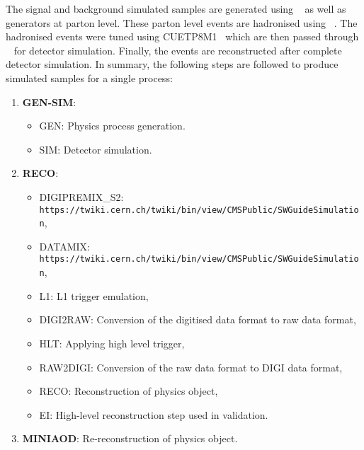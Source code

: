 The signal and background simulated samples are generated using \MGvATNLO~\cite{Alwall:2011uj, Alwall:2014hca}
as well as \POWHEG~\cite{Frixione:2007vw, Nason:2004rx, Alioli:2010xd} generators at parton level. 
These parton level events are hadronised using \PYTHIA~\cite{Sjostrand:2006za, Sjostrand:2007gs}. 
The hadronised events were tuned using  CUETP8M1~\cite{CMS-PAS-TOP-16-021} which are then passed
through \GEANTfour~\cite{Agostinelli:2002hh} for detector simulation. Finally, the events are
reconstructed after complete detector simulation. In summary, the 
following steps are followed to produce simulated samples for a single process:
\begin{enumerate}
    \item {\bf{GEN-SIM}}: 
        \begin{itemize}
            \item GEN: Physics process generation. 
            \item SIM: Detector simulation.
        \end{itemize}
    \item {\bf{RECO}}: 
        \begin{itemize}
            \item DIGIPREMIX\_S2: \\
                \verb|https://twiki.cern.ch/twiki/bin/view/CMSPublic/SWGuideSimulation|, 
            \item DATAMIX: \\\verb|https://twiki.cern.ch/twiki/bin/view/CMSPublic/SWGuideSimulation|,
            \item L1: L1 trigger emulation,
            \item DIGI2RAW: Conversion of the digitised data format to raw data format, 
            \item HLT: Applying high level trigger,
            \item RAW2DIGI: Conversion of the raw data format to DIGI data format,
            \item RECO: Reconstruction of physics object,
            \item EI: High-level reconstruction step used in validation.
        \end{itemize}
    \item {\bf{MINIAOD}}: Re-reconstruction of physics object.
\end{enumerate}

